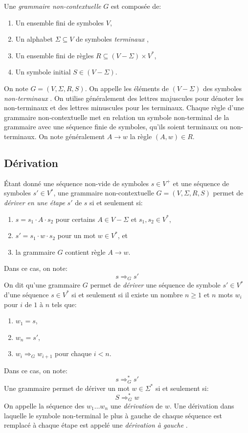 Une \og \textit{grammaire non-contextuelle} \fg{} $G$ est composée de:
\begin{enumerate}
\item Un ensemble fini de symboles $V$,
\item Un alphabet $\Sigma \subseteq V$ de symboles \og \textit{terminaux} \fg{},
\item Un ensemble fini de règles $R \subseteq (V - \Sigma) \times V^*$,
\item Un symbole initial $S \in (V - \Sigma)$.
\end{enumerate}
On note $G = (V, \Sigma, R, S)$.
On appelle les éléments de $(V - \Sigma)$ des symboles \og \textit{non-terminaux} \fg{}.
On utilise généralement des lettres majuscules pour dénoter les non-terminaux et des lettres minuscules pour les terminaux.
Chaque règle d'une grammaire non-contextuelle met en relation un symbole non-terminal de la grammaire avec une séquence finie de symboles, qu'ils soient terminaux ou non-terminaux. On note généralement $A \to w$ la règle $(A, w) \in R$.

\subsection{Dérivation}

Étant donné une séquence non-vide de symboles $s \in V^+$ et une séquence de symboles $s' \in V^*$, une grammaire non-contextuelle $G = (V, \Sigma, R, S)$ permet de \og \textit{dériver en une étape} \fg{} $s'$ de $s$ si et seulement si:
\begin{enumerate}
\item $s = s_1 \cdot A \cdot s_2$ pour certains $A \in V - \Sigma$ et $s_1, s_2 \in V^*$,
\item $s' = s_1 \cdot w \cdot s_2$ pour un mot $w \in V^*$, et
\item la grammaire $G$ contient règle $A \to w$.
\end{enumerate}
Dans ce cas, on note:
\[
s \Rightarrow_G s'
\]
On dit qu'une grammaire $G$ permet de \og \textit{dériver} \fg{} une séquence de symbole $s' \in V^*$ d'une séquence $s \in V^*$ si et seulement si il existe un nombre $n \geq 1$ et $n$ mots $w_i$ pour $i$ de $1$ à $n$ tels que:
\begin{enumerate}
\item $w_1 = s$,
\item $w_n = s'$,
\item $w_i \Rightarrow_G w_{i+1}$ pour chaque $i < n$.
\end{enumerate}
Dans ce cas, on note:
\[
s \Rightarrow_G^* s'
\]
Une grammaire permet de dériver un mot $w \in \Sigma^*$ si et seulement si:
\[
S \Rightarrow_G^* w
\]
On appelle la séquence des $w_1 \dots w_n$ une \og \textit{dérivation} \fg{} de $w$.
Une dérivation dans laquelle le symbole non-terminal le plus à gauche de chaque séquence est remplacé à chaque étape est appelé une \og \textit{dérivation à gauche} \fg.

